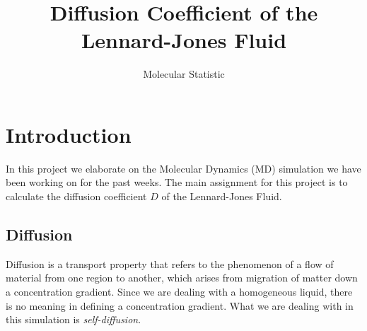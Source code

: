 \documentclass{article}
\title{Diffusion Coefficient of the Lennard-Jones Fluid}
\author{Molecular Statistic}
\date{}
\begin{document}



\maketitle

\section{Introduction}

In this project we elaborate on the Molecular Dynamics (MD)
simulation we have been working on for the past weeks.
The main assignment for this project is to calculate the
diffusion coefficient $D$ of the Lennard-Jones Fluid.\\




\subsection{Diffusion}

Diffusion is a transport property that refers to the phenomenon
of a flow of material from one region to another,
which arises from migration of matter down a concentration gradient.
Since we are dealing with a homogeneous liquid, there is no
meaning in defining a concentration gradient.
What we are dealing with
in this simulation is {\em self-diffusion}.\\
\end{document}
